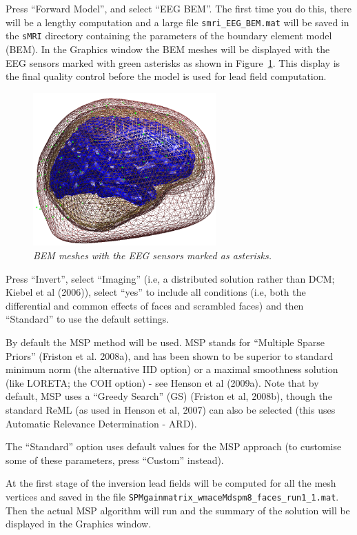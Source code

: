 Press ``Forward Model'', and select ``EEG BEM''. The first time you do this, there will be a lengthy computation and a large file \texttt{smri\_EEG\_BEM.mat} will be saved in the \texttt{sMRI} directory containing the parameters of the boundary element model (BEM). In the Graphics window the BEM meshes will be displayed with the EEG sensors marked with green asterisks as shown in Figure~\ref{multimodal:fig:2}. This display is the final quality control before the model is used for lead field computation.

\begin{figure}
\begin{center}
\includegraphics[width=70mm]{multimodal/figures/eeg_forward.png}
\caption{\em BEM meshes with the EEG sensors marked as asterisks.\label{multimodal:fig:2}}
\end{center}
\end{figure}

Press ``Invert'', select ``Imaging'' (i.e, a distributed solution rather than DCM; Kiebel et al (2006)), select ``yes'' to include all conditions (i.e, both the differential and common effects of faces and scrambled faces) and then ``Standard'' to use the default settings.

By default the MSP method will be used. MSP stands for ``Multiple Sparse Priors'' (Friston et al. 2008a), and has been shown to be superior to standard minimum norm (the alternative IID option) or a maximal smoothness solution (like LORETA; the COH option) - see Henson et al (2009a). Note that by default, MSP uses a ``Greedy Search'' (GS) (Friston et al, 2008b), though the standard ReML (as used in Henson et al, 2007) can also be selected (this uses Automatic Relevance Determination - ARD).

The ``Standard'' option uses default values for the MSP approach (to customise some of these parameters, press ``Custom'' instead).

At the first stage of the inversion lead fields will be computed for all the mesh vertices and saved in the file \texttt{SPMgainmatrix\_wmaceMdspm8\_faces\_run1\_1.mat}. Then the actual MSP algorithm will run and the summary of the solution will be displayed in the Graphics window.

